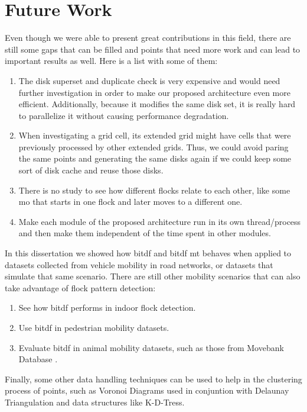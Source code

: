\section{Future Work}
Even though we were able to present great contributions in this field, there are still some gaps that can be filled and
points that need more work and can lead to important results as well. Here is a list with some of them:

\begin{enumerate}
    \item The disk superset and duplicate check is very expensive and would need further investigation in order to make
        our proposed architecture even more efficient. Additionally, because it modifies the same disk set, it is really
        hard to parallelize it without causing performance degradation.
    \item When investigating a grid cell, its extended grid might have cells that were previously processed by other
        extended grids. Thus, we could avoid paring the same points and generating the same disks again if we could keep
        some sort of disk cache and reuse those disks.
    \item There is no study to see how different flocks relate to each other, like some \ac{mo} that starts in one flock
        and later moves to a different one.
    \item Make each module of the proposed architecture run in its own thread/process and then make them independent of
        the time spent in other modules.
\end{enumerate}

In this dissertation we showed how \ac{bitdf} and \ac{bitdf} \ac{mt} behaves when applied to datasets collected from
vehicle mobility in road networks, or datasets that simulate that same scenario. There are still other mobility
scenarios that can also take advantage of flock pattern detection:

\begin{enumerate}
    \item See how \ac{bitdf} performs in indoor flock detection.
    \item Use \ac{bitdf} in pedestrian mobility datasets.
    \item Evaluate \ac{bitdf} in animal mobility datasets, such as those from Movebank Database \citep{movebank}.
\end{enumerate}

Finally, some other data handling techniques can be used to help in the clustering process of points, such as Voronoi
Diagrams used in conjuntion with Delaunay Triangulation and data structures like K-D-Tress.

